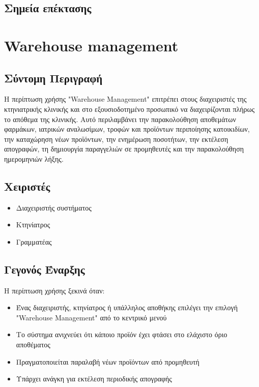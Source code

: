 \documentclass[12pt,a4paper,twoside]{book}
\begin{document}
\subsection{Σημεία επέκτασης}

\section{Warehouse management}

\subsection{Σύντομη Περιγραφή}
Η περίπτωση χρήσης "Warehouse Management" επιτρέπει στους διαχειριστές της κτηνιατρικής κλινικής και στο εξουσιοδοτημένο προσωπικό να διαχειρίζονται πλήρως το απόθεμα της κλινικής. Αυτό περιλαμβάνει την παρακολούθηση αποθεμάτων φαρμάκων, ιατρικών αναλωσίμων, τροφών και προϊόντων περιποίησης κατοικιδίων, την καταχώρηση νέων προϊόντων, την ενημέρωση ποσοτήτων, την εκτέλεση απογραφών, τη δημιουργία παραγγελιών σε προμηθευτές και την παρακολούθηση ημερομηνιών λήξης.

\subsection{Χειριστές}
\begin{itemize}
  \item Διαχειριστής συστήματος
  \item Κτηνίατρος
  \item Γραμματέας
\end{itemize}

\subsection{Γεγονός Έναρξης}
Η περίπτωση χρήσης ξεκινά όταν:
\begin{itemize}
  \item Ένας διαχειριστής, κτηνίατρος ή υπάλληλος αποθήκης επιλέγει την επιλογή "Warehouse Management" από το κεντρικό μενού
  \item Το σύστημα ανιχνεύει ότι κάποιο προϊόν έχει φτάσει στο ελάχιστο όριο αποθέματος
  \item Πραγματοποιείται παραλαβή νέων προϊόντων από προμηθευτή
  \item Υπάρχει ανάγκη για εκτέλεση περιοδικής απογραφής
\end{itemize}
\end{document}
